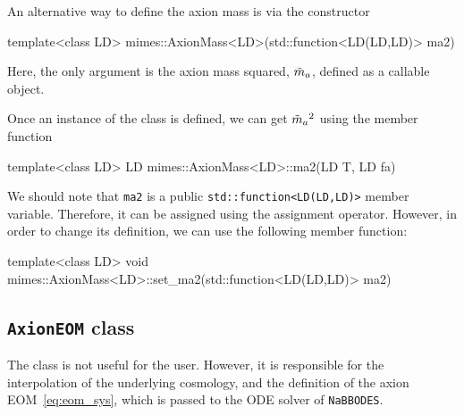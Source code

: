 \documentclass[11pt,a4paper]{article}
\begin{document}
An alternative way to define the axion mass is via the constructor
%
\begin{cpp}
	template<class LD>
	mimes::AxionMass<LD>(std::function<LD(LD,LD)> ma2)
\end{cpp}
%
Here, the only argument is the axion mass squared, $\tilde m_{a}{}$, defined as a callable object.


Once an instance of the class is defined, we can get $\tilde m_{a}{}^2$ using the member function
%
\begin{cpp}
	template<class LD>	LD mimes::AxionMass<LD>::ma2(LD T, LD fa)
\end{cpp}
%
We should note that {\tt ma2} is a public {\tt std::function<LD(LD,LD)>} member variable. Therefore, it can be assigned using the assignment operator. However,  in order to change its definition, we can use the following member function:
%
\begin{cpp}
	template<class LD> void mimes::AxionMass<LD>::set_ma2(std::function<LD(LD,LD)> ma2)
\end{cpp}


\subsection{{\tt AxionEOM} class}
%
The  class is not useful for the user. However, it is responsible for the interpolation of the underlying cosmology, and the definition of the axion EOM~\ref{eq:eom_sys}, which is passed to the ODE solver of {\tt NaBBODES}. 
\end{document}
